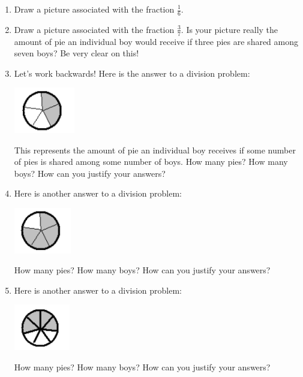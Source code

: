  \begin{enumerate}
 \item
 Draw a picture associated with the fraction $ \frac 1 6$.\\
 
 \item
Draw a picture associated with the fraction $ \frac 3 7$.
Is your picture
really the amount of pie an individual boy would receive if three pies are shared
among seven boys? Be very clear on this!\\

\item
Let's work backwards! Here is the answer to a division problem:
\begin{center}
\includegraphics[height = 2cm]{2fifthspie}
\end{center}
This represents the amount of pie an individual boy receives if some number of pies
is shared among some number of boys.  How many pies?  How many boys?  How can you justify your answers?\\

\item
Here is another answer to a division problem:
\begin{center}
\includegraphics[height = 2cm]{4fifthspie}
\end{center}
How many pies?  How many boys?  How can you justify your answers?\\


\item
Here is another answer to a division problem:
\begin{center}
\includegraphics[height = 2cm]{4seventhspie}
\end{center}
How many pies?  How many boys?  How can you justify your answers?\\


\end{enumerate}
